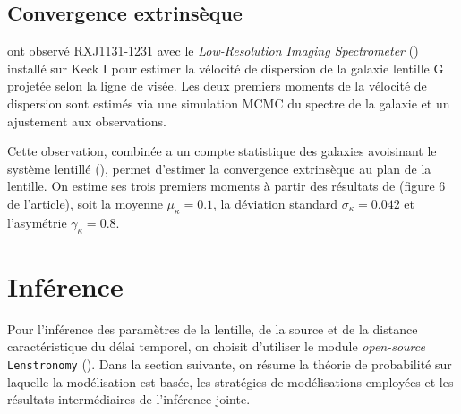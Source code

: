 \documentclass[times,10pt,twocolumn]{article}
\begin{document}
\subsection{Convergence extrinsèque}
\citet{Suyu2013} ont observé RXJ1131-1231 avec le \textit{Low-Resolution Imaging 
Spectrometer} (\citet{Oke1995}) installé sur Keck I 
pour estimer la vélocité de dispersion de la galaxie lentille G projetée 
selon la ligne de visée. Les deux premiers moments de la vélocité
de dispersion sont estimés via une simulation MCMC du spectre de la galaxie 
et un ajustement aux observations.


Cette observation, combinée a un compte statistique 
des galaxies avoisinant le système lentillé (\citet{Fassnacht2011}), permet d'estimer 
la convergence extrinsèque au plan de la lentille. On estime ses trois premiers 
moments à partir des résultats de \citet{Suyu2013} (figure 6 de l'article), 
soit la moyenne $\mu_{\kappa}=0.1$, la déviation standard $\sigma_\kappa=0.042$ et 
l'asymétrie $\gamma_\kappa=0.8$.


\section{Inférence}\label{sec:inference}
Pour l'inférence des paramètres de la lentille, de la source et 
de la distance caractéristique du délai temporel, on choisit d'utiliser 
le module \textit{open-source} \texttt{Lenstronomy} (\cite{Birrer2018}). Dans 
la section suivante, on résume la théorie de probabilité sur laquelle 
la modélisation est basée, les stratégies de modélisations employées et 
les résultats intermédiaires de l'inférence jointe.
\end{document}
